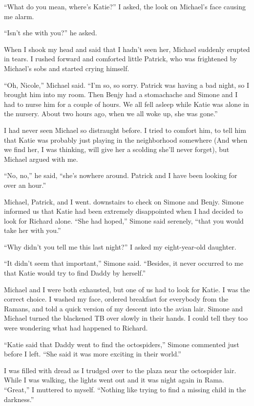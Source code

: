 \documentclass[]{article}
\begin{document}
“What do you mean, where’s Katie?” I asked, the look on Michael’s face causing me alarm.

“Isn’t she with you?” he asked.

When I shook my head and said that I hadn’t seen her, Michael suddenly erupted in tears.  I rushed forward and comforted little Patrick, who was frightened by Michael’s sobs and started crying himself.

“Oh, Nicole,” Michael said.  “I’m so, so sorry.  Patrick was having a bad night, so I brought him into my room.  Then Benjy had a stomachache and Simone and I had to nurse him for a couple of hours.  We all fell asleep while Katie was alone in the nursery.  About two hours ago, when we all woke up, she was gone.”

I had never seen Michael so distraught before.  I tried to comfort him, to tell him that Katie was probably just playing in the neighborhood somewhere (And when we find her, I was thinking, will give her a scolding she’ll never forget), but Michael argued with me.

“No, no,” he said, “she’s nowhere around.  Patrick and I have been looking for over an hour.”

Michael, Patrick, and I went.  downstairs to check on Simone and Benjy.  Simone informed us that Katie had been extremely disappointed when I had decided to look for Richard alone.  “She had hoped,” Simone said serenely, “that you would take her with you.”

“Why didn’t you tell me this last night?” I asked my eight-year-old daughter.

“It didn’t seem that important,” Simone said.  “Besides, it never occurred to me that Katie would try to find Daddy by herself.”

Michael and I were both exhausted, but one of us had to look for Katie.  I was the correct choice.  I washed my face, ordered breakfast for everybody from the Ramans, and told a quick version of my descent into the avian lair.  Simone and Michael turned the blackened TB over slowly in their hands.  I could tell they too were wondering what had happened to Richard.

“Katie said that Daddy went to find the octospiders,” Simone commented just before I left.  “She said it was more exciting in their world.”

I was filled with dread as I trudged over to the plaza near the octospider lair.  While I was walking, the lights went out and it was night again in Rama.  “Great,” I muttered to myself.  “Nothing like trying to find a missing child in the darkness.”
\end{document}
